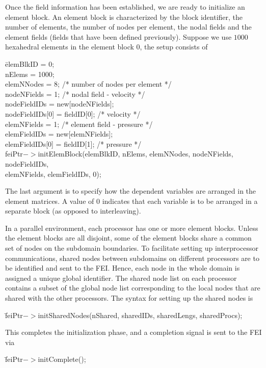 Once the field information has been established, we are ready to initialize
an element block. An element block is characterized by the block identifier,
the number of elements, the number of nodes per element, the nodal fields
and the element fields (fields that have been defined previously). Suppose
we use $1000$ hexahedral elements in the element block $0$, the setup
consists of
\begin{tabbing}
\hspace{0.5in} \= {\sf elemBlkID = 0;} \\
               \> {\sf nElems = 1000;} \\
               \> {\sf elemNNodes = 8; /* number of nodes per element */} \\
               \> {\sf nodeNFields = 1; /* nodal field - velocity */} \\
               \> {\sf nodeFieldIDs = new[nodeNFields];} \\
               \> {\sf nodeFieldIDs[0] = fieldID[0]; /* velocity */ } \\
               \> {\sf elemNFields = 1; /* element field - pressure */} \\
               \> {\sf elemFieldIDs = new[elemNFields];} \\
               \> {\sf elemFieldIDs[0] = fieldID[1]; /* pressure */ } \\
 \> {\sf feiPtr$->$initElemBlock(elemBlkID, nElems, elemNNodes, nodeNFields, nodeFieldIDs,}\\
 \> \hspace{1.0in} {\sf elemNFields, elemFieldIDs, 0);}
\end{tabbing}
The last argument is to specify how the dependent variables are arranged in
the element matrices. A value of $0$ indicates that each variable is to be
arranged in a separate block (as opposed to interleaving).
                                                                                
In a parallel environment, each processor has one or more element blocks.
Unless the element blocks are all disjoint, some of the element blocks
share a common set of nodes on the subdomain boundaries. To facilitate
setting up interprocessor communications, shared nodes between subdomains
on different processors are to be identified and sent to the FEI.
Hence, each node in the whole domain is assigned a unique global
identifier. The shared node list on each processor contains a subset
of the global node list corresponding to the local nodes that are shared
with the other processors.  The syntax for setting up the shared nodes is
\begin{tabbing}
\hspace{0.5in} \= {\sf feiPtr$->$initSharedNodes(nShared, sharedIDs, sharedLengs, sharedProcs);}
\end{tabbing}
This completes the initialization phase, and a completion signal is sent to
the FEI via
\begin{tabbing}
\hspace{0.5in} \= {\sf feiPtr$->$initComplete();}
\end{tabbing}
                                                                                

